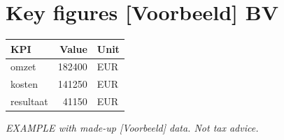\documentclass{article}
\begin{document}
\section*{Key figures [Voorbeeld] BV}
\begin{tabular}{lrl}
KPI & Value & Unit \\ \hline
omzet & 182400 & EUR \\
kosten & 141250 & EUR \\
resultaat & 41150 & EUR \\
\end{tabular}

\emph{EXAMPLE with made-up [Voorbeeld] data. Not tax advice.}
\end{document}
